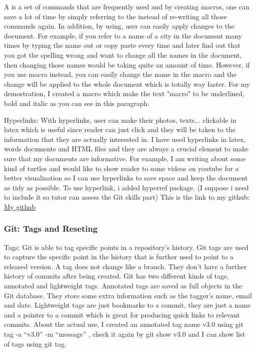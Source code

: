 \documentclass[a4paper, 11pt]{report}
\begin{document}
A\BoldandItalic{} is a set of commands that are frequently used and by creating macros, one can save a lot of time by simply referring to the\BoldandItalic{} instead of re-writing all those commands again. In addition, by using\BoldandItalic{}, user can easily apply changes to the document. For example, if you refer to a name of a city in the document many times by typing the name out or copy paste every time and later find out that you got the spelling wrong and want to change all the names in the document, then changing those names would be taking quite an amount of time. However, if you use macro instead, you can easily change the name in the macro and the change will be applied to the whole document which is totally way faster. For my demostration, I created a macro which make the text "macro" to be underlined, bold and italic  as you can see in this paragraph.

Hyperlinks: With hyperlinks, user can make their photos, texts,.. clickable in latex which is useful since reader can just click and they will be taken to the information that they are actually interested in. I have used hyperlinks in latex, words documents and HTML files and they are always a crucial element to make sure that my documents are informative. For example, I am writing about some kind of turtles and would like to show reader to some videos on youtube for a better visualization so I can use hyperlinks to save space and keep the document as tidy as possible. To use hyperlink, i added hyperref package.
(I suppose i need to include it so tutor can assess the Git skills part) This is the link to my github: \href{https://github.com/Kyle240/testing.git}{My github}

\subsubsection{ Git: Tags and Reseting}

Tags: Git is able to tag specific points in a repository’s history. Git tags are used to capture the specific point in the history that is further used to point to a released version. A tag does not change like a branch. They don’t have a further history of commits after being created. Git has two different kinds of tags, annotated and lightweight tags. Annotated tags are saved as full objects in the Git database. They store some extra information such as the tagger’s name, email and date. Lightweight tags are just bookmarks to a commit, they are just a name and a pointer to a commit which is great for producing quick links to relevant commits.  
About the actual use, I created an annotated tag name v3.0 using git tag -a “v3.0” -m “message” , check it again by git show v3.0  and I can show list of tags using git tag. 
\end{document}
